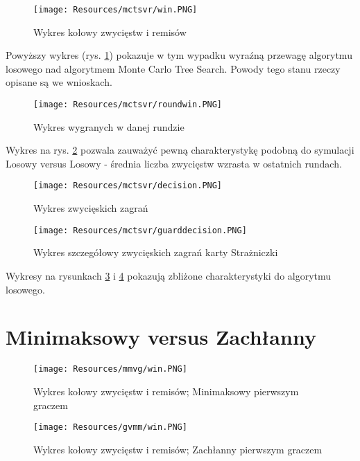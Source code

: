 \begin{figure}[H]
	\centering
	\texttt{[image: Resources/mctsvr/win.PNG]}
	\caption{Wykres kołowy zwycięstw i remisów} 
	\label{fig:mctsvrwin}
\end{figure}

Powyższy wykres (rys. \ref{fig:mctsvrwin}) pokazuje w tym wypadku wyraźną przewagę algorytmu losowego nad algorytmem Monte Carlo Tree Search. Powody tego stanu rzeczy opisane są we wnioskach.

\begin{figure}[H]
	\centering
	\texttt{[image: Resources/mctsvr/roundwin.PNG]}
	\caption{Wykres wygranych w danej rundzie} 
	\label{fig:mctsvrroundwin}
\end{figure}

Wykres na rys. \ref{fig:mctsvrroundwin} pozwala zauważyć pewną charakterystykę podobną do symulacji Losowy versus Losowy - średnia liczba zwycięstw wzrasta w ostatnich rundach.

\begin{figure}[H]
	\centering
	\texttt{[image: Resources/mctsvr/decision.PNG]}
	\caption{Wykres zwycięskich zagrań} 
	\label{fig:mctsvrdecision}
\end{figure} 

\begin{figure}[H]
	\centering
	\texttt{[image: Resources/mctsvr/guarddecision.PNG]}
	\caption{Wykres szczegółowy zwycięskich zagrań karty Strażniczki} 
	\label{fig:mctsvrguarddecision}
\end{figure}

Wykresy na rysunkach \ref{fig:mctsvrdecision} i \ref{fig:mctsvrguarddecision} pokazują zbliżone charakterystyki do algorytmu losowego.

\section{Minimaksowy versus Zachłanny}

\begin{figure}[H]
	\centering
	\texttt{[image: Resources/mmvg/win.PNG]}
	\caption{Wykres kołowy zwycięstw i remisów; Minimaksowy pierwszym graczem} 
	\label{fig:mmvgwin}
\end{figure}

\begin{figure}[H]
	\centering
	\texttt{[image: Resources/gvmm/win.PNG]}
	\caption{Wykres kołowy zwycięstw i remisów; Zachłanny pierwszym graczem} 
	\label{fig:gvmmwin}
\end{figure}

